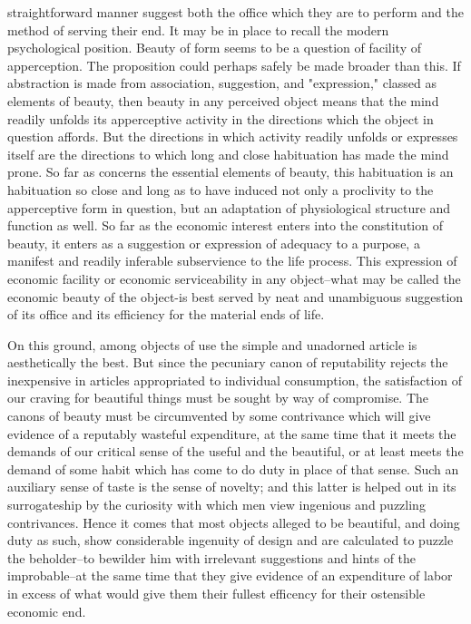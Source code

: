\documentclass[12pt]{report}
\begin{document}
straightforward manner suggest both the office which they are to perform
and the method of serving their end. It may be in place to recall the
modern psychological position. Beauty of form seems to be a question of
facility of apperception. The proposition could perhaps safely be made
broader than this. If abstraction is made from association, suggestion,
and "expression," classed as elements of beauty, then beauty in any
perceived object means that the mind readily unfolds its apperceptive
activity in the directions which the object in question affords. But the
directions in which activity readily unfolds or expresses itself are the
directions to which long and close habituation has made the mind prone.
So far as concerns the essential elements of beauty, this habituation
is an habituation so close and long as to have induced not only a
proclivity to the apperceptive form in question, but an adaptation of
physiological structure and function as well. So far as the economic
interest enters into the constitution of beauty, it enters as a
suggestion or expression of adequacy to a purpose, a manifest and
readily inferable subservience to the life process. This expression of
economic facility or economic serviceability in any object--what may
be called the economic beauty of the object-is best served by neat and
unambiguous suggestion of its office and its efficiency for the material
ends of life.

On this ground, among objects of use the simple and unadorned article
is aesthetically the best. But since the pecuniary canon of reputability
rejects the inexpensive in articles appropriated to individual
consumption, the satisfaction of our craving for beautiful things
must be sought by way of compromise. The canons of beauty must be
circumvented by some contrivance which will give evidence of a reputably
wasteful expenditure, at the same time that it meets the demands of our
critical sense of the useful and the beautiful, or at least meets the
demand of some habit which has come to do duty in place of that sense.
Such an auxiliary sense of taste is the sense of novelty; and this
latter is helped out in its surrogateship by the curiosity with which
men view ingenious and puzzling contrivances. Hence it comes that
most objects alleged to be beautiful, and doing duty as such, show
considerable ingenuity of design and are calculated to puzzle the
beholder--to bewilder him with irrelevant suggestions and hints of the
improbable--at the same time that they give evidence of an expenditure
of labor in excess of what would give them their fullest efficency for
their ostensible economic end.
\end{document}
